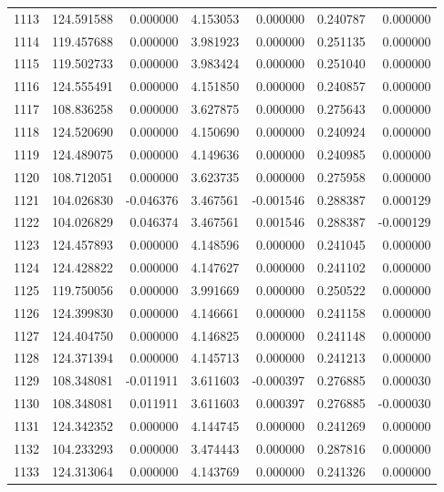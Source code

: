 \begin{tabular}{rrrrrrr}
1113 & 124.591588 &    0.000000 &  4.153053 &   0.000000 &   0.240787 &  0.000000 \\
1114 & 119.457688 &    0.000000 &  3.981923 &   0.000000 &   0.251135 &  0.000000 \\
1115 & 119.502733 &    0.000000 &  3.983424 &   0.000000 &   0.251040 &  0.000000 \\
1116 & 124.555491 &    0.000000 &  4.151850 &   0.000000 &   0.240857 &  0.000000 \\
1117 & 108.836258 &    0.000000 &  3.627875 &   0.000000 &   0.275643 &  0.000000 \\
1118 & 124.520690 &    0.000000 &  4.150690 &   0.000000 &   0.240924 &  0.000000 \\
1119 & 124.489075 &    0.000000 &  4.149636 &   0.000000 &   0.240985 &  0.000000 \\
1120 & 108.712051 &    0.000000 &  3.623735 &   0.000000 &   0.275958 &  0.000000 \\
1121 & 104.026830 &   -0.046376 &  3.467561 &  -0.001546 &   0.288387 &  0.000129 \\
1122 & 104.026829 &    0.046374 &  3.467561 &   0.001546 &   0.288387 & -0.000129 \\
1123 & 124.457893 &    0.000000 &  4.148596 &   0.000000 &   0.241045 &  0.000000 \\
1124 & 124.428822 &    0.000000 &  4.147627 &   0.000000 &   0.241102 &  0.000000 \\
1125 & 119.750056 &    0.000000 &  3.991669 &   0.000000 &   0.250522 &  0.000000 \\
1126 & 124.399830 &    0.000000 &  4.146661 &   0.000000 &   0.241158 &  0.000000 \\
1127 & 124.404750 &    0.000000 &  4.146825 &   0.000000 &   0.241148 &  0.000000 \\
1128 & 124.371394 &    0.000000 &  4.145713 &   0.000000 &   0.241213 &  0.000000 \\
1129 & 108.348081 &   -0.011911 &  3.611603 &  -0.000397 &   0.276885 &  0.000030 \\
1130 & 108.348081 &    0.011911 &  3.611603 &   0.000397 &   0.276885 & -0.000030 \\
1131 & 124.342352 &    0.000000 &  4.144745 &   0.000000 &   0.241269 &  0.000000 \\
1132 & 104.233293 &    0.000000 &  3.474443 &   0.000000 &   0.287816 &  0.000000 \\
1133 & 124.313064 &    0.000000 &  4.143769 &   0.000000 &   0.241326 &  0.000000 \\

\end{tabular}
